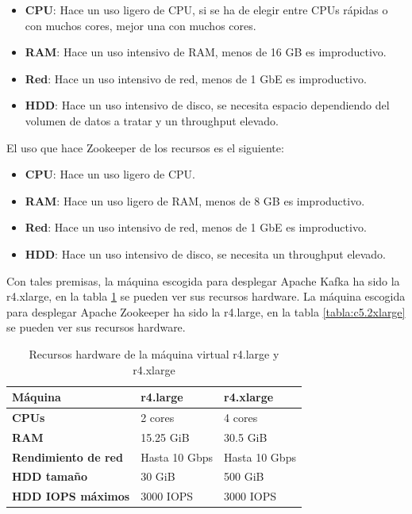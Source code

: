 \begin{itemize} 
	\item \textbf{CPU}: Hace un uso ligero de CPU, si se ha de elegir entre CPUs rápidas o con muchos cores, mejor una con muchos cores.
	\item \textbf{RAM}: Hace un uso intensivo de RAM, menos de 16 GB es improductivo.
	\item \textbf{Red}: Hace un uso intensivo de red, menos de 1 GbE es improductivo.
	\item \textbf{HDD}: Hace un uso intensivo de disco, se necesita espacio dependiendo del volumen de datos a tratar y un throughput elevado.
\end{itemize}

El uso que hace Zookeeper de los recursos es el siguiente\cite{Tfg:zookeeperdeploy}:

\begin{itemize} 
	\item \textbf{CPU}: Hace un uso ligero de CPU.
	\item \textbf{RAM}: Hace un uso ligero de RAM, menos de 8 GB es improductivo.
	\item \textbf{Red}: Hace un uso intensivo de red, menos de 1 GbE es improductivo.
	\item \textbf{HDD}: Hace un uso intensivo de disco, se necesita un throughput elevado.
\end{itemize}

Con tales premisas, la máquina escogida para desplegar Apache Kafka ha sido la r4.xlarge, en la tabla \ref{tabla:kafkazookeeper} se pueden ver sus recursos hardware. La máquina escogida para desplegar Apache Zookeeper ha sido la r4.large, en la tabla \ref{tabla:c5.2xlarge} se pueden ver sus recursos hardware.

\begin{table}[H]\label{tabla:kafkazookeeper}
	\centering
	\begin{tabular}{|l|l|l|}
		\hline
		\textbf{Máquina}            & \textbf{r4.large} & \textbf{r4.xlarge} \\ \hline
		\textbf{CPUs}               & 2 cores           & 4 cores            \\ \hline
		\textbf{RAM}                & 15.25 GiB         & 30.5 GiB           \\ \hline
		\textbf{Rendimiento de red} & Hasta 10 Gbps     & Hasta 10 Gbps      \\ \hline
		\textbf{HDD tamaño}         & 30 GiB            & 500 GiB            \\ \hline
		\textbf{HDD IOPS máximos}   & 3000 IOPS         & 3000 IOPS          \\ \hline
	\end{tabular}
	\caption{Recursos hardware de la máquina virtual r4.large y r4.xlarge}
\end{table}


